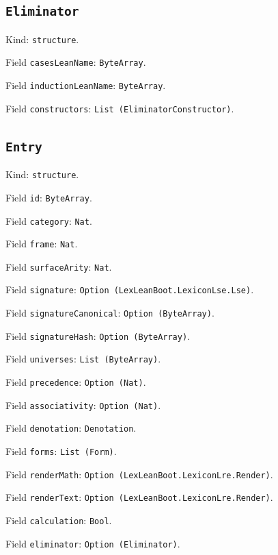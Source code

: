 \documentclass[11pt]{article}
\begin{document}
\subsection*{\texttt{Eliminator}}
\noindent Kind: \texttt{structure}.\par
\noindent Field \texttt{casesLeanName}: \texttt{ByteArray}.\par
\noindent Field \texttt{inductionLeanName}: \texttt{ByteArray}.\par
\noindent Field \texttt{constructors}: \texttt{List (EliminatorConstructor)}.\par
\subsection*{\texttt{Entry}}
\noindent Kind: \texttt{structure}.\par
\noindent Field \texttt{id}: \texttt{ByteArray}.\par
\noindent Field \texttt{category}: \texttt{Nat}.\par
\noindent Field \texttt{frame}: \texttt{Nat}.\par
\noindent Field \texttt{surfaceArity}: \texttt{Nat}.\par
\noindent Field \texttt{signature}: \texttt{Option (LexLeanBoot.LexiconLse.Lse)}.\par
\noindent Field \texttt{signatureCanonical}: \texttt{Option (ByteArray)}.\par
\noindent Field \texttt{signatureHash}: \texttt{Option (ByteArray)}.\par
\noindent Field \texttt{universes}: \texttt{List (ByteArray)}.\par
\noindent Field \texttt{precedence}: \texttt{Option (Nat)}.\par
\noindent Field \texttt{associativity}: \texttt{Option (Nat)}.\par
\noindent Field \texttt{denotation}: \texttt{Denotation}.\par
\noindent Field \texttt{forms}: \texttt{List (Form)}.\par
\noindent Field \texttt{renderMath}: \texttt{Option (LexLeanBoot.LexiconLre.Render)}.\par
\noindent Field \texttt{renderText}: \texttt{Option (LexLeanBoot.LexiconLre.Render)}.\par
\noindent Field \texttt{calculation}: \texttt{Bool}.\par
\noindent Field \texttt{eliminator}: \texttt{Option (Eliminator)}.\par
\end{document}
